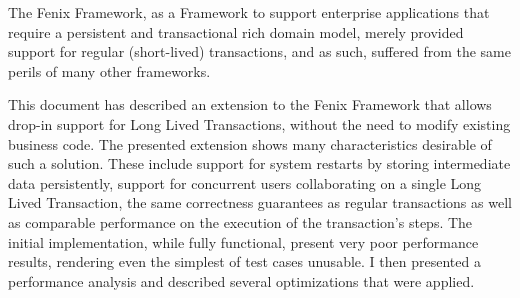 \documentclass{llncs}
\begin{document}
The Fenix Framework, as a Framework to support enterprise applications
that require a persistent and transactional rich domain model, merely
provided support for regular (short-lived) transactions, and as such,
suffered from the same perils of many other frameworks.

This document has described an extension to the Fenix Framework that
allows drop-in support for Long Lived Transactions, without the need
to modify existing business code. The presented extension shows many
characteristics desirable of such a solution. These include support
for system restarts by storing intermediate data persistently, support
for concurrent users collaborating on a single Long Lived Transaction,
the same correctness guarantees as regular transactions as well as
comparable performance on the execution of the transaction's
steps. The initial implementation, while fully functional, present
very poor performance results, rendering even the simplest of test
cases unusable. I then presented a performance analysis and described
several optimizations that were applied.

 
\end{document}
